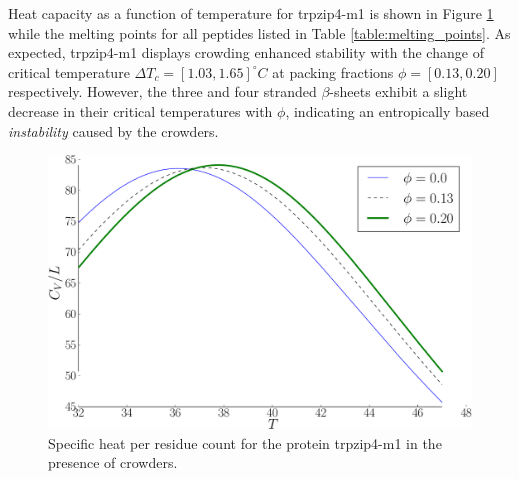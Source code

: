 Heat capacity as a function of temperature for trpzip4-m1 is shown in Figure \ref{fig:trpzip_CV_plot} while the melting points for all peptides listed in Table \ref{table:melting_points}.  As expected, trpzip4-m1 displays crowding enhanced stability with the change of critical temperature $\Delta T_c=[1.03, 1.65] ^\circ C$ at packing fractions $\phi=[0.13, 0.20]$ respectively. However, the three and four stranded $\beta$-sheets exhibit a slight decrease in their critical temperatures with $\phi$, indicating an entropically based \textit{instability} caused by the crowders. 
\begin{figure}[ht]
\includegraphics[width=\figurewidthSINGLE]{WL_crowding_paper/PLOT_trpzip_CV-crop.pdf}
\caption{Specific heat per residue count for the protein trpzip4-m1 in the presence of crowders.}
\label{fig:trpzip_CV_plot}
\end{figure}


